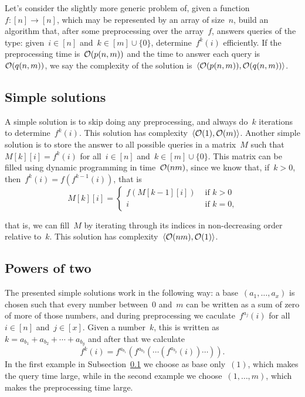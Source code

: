 \documentclass[main.tex]{subfiles}
\begin{document}
Let's consider the slightly more generic problem of, given a function~$f: [n] \rightarrow [n]$, which may be represented by an array of size~$n$, build an algorithm that, after some preprocessing over the array~$f$, answers queries of the type: given~$i \in [n]$ and~$k \in [m] \cup \{0\}$, determine~$f^k(i)$ efficiently. If the preprocessing time is~$\mathcal{O}(p(n, m))$ and the time to answer each query is~$\mathcal{O}(q(n, m))$, we say the complexity of the solution is~$\langle\mathcal{O}(p(n, m)), \mathcal{O}(q(n, m))\rangle$.

\subsection{Simple solutions} \label{subsec:anc_sol_simples}

A simple solution is to skip doing any preprocessing, and always do~$k$ iterations to determine~$f^k(i)$. This solution has complexity~$\langle\mathcal{O}(1), \mathcal{O}(m)\rangle$. Another simple solution is to store the answer to all possible queries in a matrix~$M$ such that~$M[k][i] = f^k(i)$ for all~$i \in [n]$ and~$k \in [m] \cup \{0\}$. This matrix can be filled using dynamic programming in time~$\mathcal{O}(nm)$, since we know that, if~$k > 0$, then~$f^k(i) = f(f^{k-1}(i))$, that is
$$M[k][i] = \left\{
	\begin{array}{ll}
		f(M[k - 1][i]) & \text{ if $k > 0$} \\
		i & \text{ if $k = 0$,}
	\end{array}
	\right.
$$

that is, we can fill~$M$ by iterating through its indices in non-decreasing order relative to~$k$. This solution has complexity~$\langle\mathcal{O}(nm), \mathcal{O}(1)\rangle$.

\subsection{Powers of two} \label{subsec:pot2}

The presented simple solutions work in the following way: a base~$(a_1, \ldots, a_x)$ is chosen such that every number between~0 and~$m$ can be written as a sum of zero of more of those numbers, and during preprocessing we caculate~$f^{a_j}(i)$ for all~$i \in [n]$ and~$j \in [x]$. Given a number~$k$, this is written as~${k = a_{b_1} + a_{b_2} + \cdots + a_{b_y}}$ and after that we calculate
$$f^k(i) = f^{a_{b_1}}(f^{a_{b_2}}(\cdots(f^{a_{b_y}}(i))\cdots)).$$
In the first example in Subsection~\ref{subsec:anc_sol_simples} we choose as base only~$(1)$, which makes the query time large, while in the second example we choose~$(1, \ldots, m)$, which makes the preprocessing time large.
\end{document}
